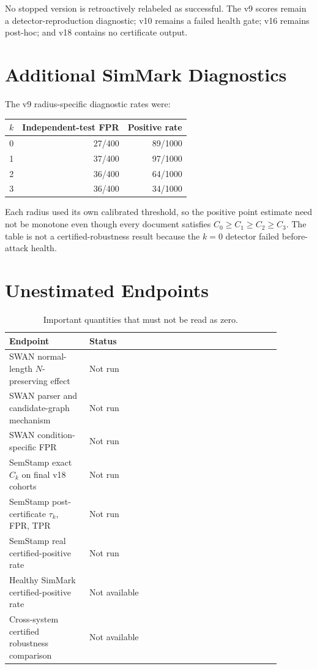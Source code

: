 \documentclass[10pt]{article}
\begin{document}
No stopped version is retroactively relabeled as successful. The v9 scores
remain a detector-reproduction diagnostic; v10 remains a failed health gate;
v16 remains post-hoc; and v18 contains no certificate output.

\section{Additional SimMark Diagnostics}

The v9 radius-specific diagnostic rates were:

\begin{center}
\begin{tabular}{rrr}
\toprule
$k$ & Independent-test FPR & Positive rate \\
\midrule
0 & 27/400 & 89/1000 \\
1 & 37/400 & 97/1000 \\
2 & 36/400 & 64/1000 \\
3 & 36/400 & 34/1000 \\
\bottomrule
\end{tabular}
\end{center}

Each radius used its own calibrated threshold, so the positive point estimate
need not be monotone even though every document satisfies
$C_0\geq C_1\geq C_2\geq C_3$. The table is not a certified-robustness result
because the $k=0$ detector failed before-attack health.

\clearpage
\section{Unestimated Endpoints}

\begin{table}[h]
\caption{Important quantities that must not be read as zero.}
\label{tab:unestimated}
\centering
\small
\begin{tabular}{p{0.26\linewidth}p{0.62\linewidth}}
\toprule
Endpoint & Status \\
\midrule
SWAN normal-length $N$-preserving effect & Not run \\
SWAN parser and candidate-graph mechanism & Not run \\
SWAN condition-specific FPR & Not run \\
SemStamp exact $C_k$ on final v18 cohorts & Not run \\
SemStamp post-certificate $\tau_k$, FPR, TPR & Not run \\
SemStamp real certified-positive rate & Not run \\
Healthy SimMark certified-positive rate & Not available \\
Cross-system certified robustness comparison & Not available \\
\bottomrule
\end{tabular}
\end{table}
\end{document}
